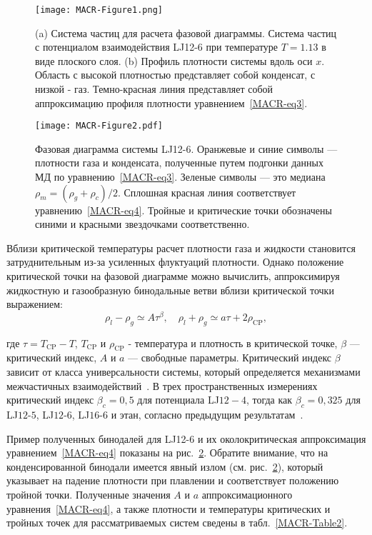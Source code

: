 \begin{figure}[!t]
\centering
 \texttt{[image: MACR-Figure1.png]}
 \caption{(a) Система частиц для расчета фазовой диаграммы. Система частиц с потенциалом взаимодействия LJ12-6 при температуре $T=1.13$ в виде плоского слоя.
   (b) Профиль плотности системы вдоль оси $x$. Область с высокой плотностью представляет собой конденсат, с низкой - газ. Темно-красная линия представляет собой аппроксимацию профиля плотности уравнением~\eqref{MACR-eq3}.}
\label{MACR-Figure1}
\end{figure}


\begin{figure}[!t]
\centering
 \texttt{[image: MACR-Figure2.pdf]}
 \caption{Фазовая диаграмма системы LJ12-6.
  Оранжевые и синие символы — плотности газа и конденсата, полученные путем подгонки данных МД по уравнению~\eqref{MACR-eq3}.
  Зеленые символы — это медиана $\rho_m=(\rho_g+\rho_c)/2$.
  Сплошная красная линия соответствует уравнению~\eqref{MACR-eq4}.
  Тройные и критические точки обозначены синими и красными звездочками соответственно.
 }
\label{MACR-Figure2}
\end{figure}

Вблизи критической температуры расчет плотности газа и жидкости становится затруднительным из-за усиленных флуктуаций плотности.
Однако положение критической точки на фазовой диаграмме можно вычислить, аппроксимируя жидкостную и газообразную бинодальные ветви вблизи критической точки выражением:
\begin{equation}
    \rho_{l}-\rho_{g} \simeq A \tau^{\beta}, \quad \rho_{l}+\rho_{g} \simeq a \tau+2 \rho_{\mathrm{CP}},
\label{MACR-eq4}
\end{equation}

где $\tau=T_{\mathrm{CP}}-T$, $T_{\mathrm{CP}}$ и $\rho_{\mathrm{CP}}$ - температура и плотность в критической точке, $ \beta$ — критический индекс, $A$ и $a$ — свободные параметры.
Критический индекс $\beta$ зависит от класса универсальности системы, который определяется механизмами межчастичных взаимодействий~\cite{10.1103/physrevlett.89.025703}.
В трех пространственных измерениях критический индекс $\beta_c = 0,5$ для потенциала LJ$12-4$, тогда как $\beta_c = 0,325$ для LJ$12$-$5$, LJ$12$-$6$, LJ$16$-$6$ и этан, согласно предыдущим результатам~\cite{10.1021/acs.jced.6b01036,10.1021/jp9072137,10.1103/physrevlett.89.025703}.

Пример полученных бинодалей для LJ12-6 и их околокритическая аппроксимация уравнением~\eqref{MACR-eq4} показаны на рис.~\ref{MACR-Figure2}.
Обратите внимание, что на конденсированной бинодали имеется явный излом (см. рис.~\ref{MACR-Figure2}), который указывает на падение плотности при плавлении и соответствует положению тройной точки.
Полученные значения $A$ и $a$ аппроксимационного уравнения~\eqref{MACR-eq4}, а также плотности и температуры критических и тройных точек для рассматриваемых систем сведены в табл.~\ref{MACR-Table2}.

